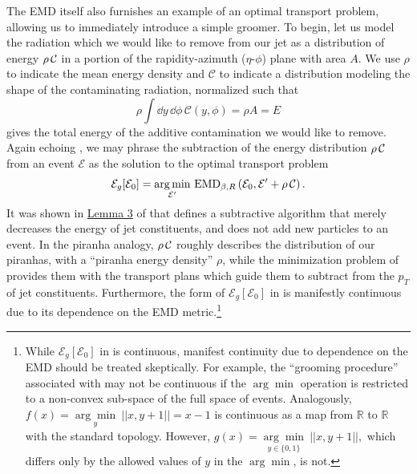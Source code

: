 The EMD itself also furnishes an example of an optimal transport problem, allowing us to immediately introduce a simple \PIRANHA{} groomer.
%
To begin, let us model the radiation which we would like to remove from our jet as a distribution of energy \(\rho\,\mathcal{C}\) in a portion of the rapidity-azimuth (\(\eta\)-\(\phi\)) plane with area \(A\).
%
We use \(\rho\) to indicate the mean energy density and \(\mathcal{C}\) to indicate a distribution modeling the shape of the contaminating radiation, normalized such that
\begin{equation}
    \rho\int \dd y\,\dd\phi\,\mathcal{C}(y,\phi) = \rho A = E
\end{equation}
gives the total energy of the additive contamination we would like to remove.
%
Again echoing , we may phrase the subtraction of the energy distribution \(\rho\,\mathcal{C}\) from an event \(\mathcal{E}\) as the solution to the optimal transport problem
\begin{align}
    \mathcal{E}_g[\mathcal E_0] = \underset{\mathcal{E}'}{\arg \min}\ {\rm EMD}_{\beta, R}
    \left(\mathcal{E}_0, \mathcal{E}' + \rhoC\right)
    \label{eqn:simple_piranha}
    .
\end{align}
%
It was shown in \href{https://arxiv.org/pdf/2004.04159.pdf#page=33\&zoom=100,0,0}{Lemma 3} of  that  defines a subtractive algorithm that merely decreases the energy of jet constituents, and does not add new particles to an event.
%
In the piranha analogy, \(\rho\,\mathcal{C}\) roughly describes the distribution of our piranhas, with a ``piranha energy density'' \(\rho\), while the minimization problem of  provides them with the transport plans which guide them to subtract from the \(p_T\) of jet constituents.
%
Furthermore, the form of \(\mathcal{E}_g[\mathcal E_0]\) in  is manifestly continuous due to its dependence on the EMD metric.\footnote{
While \(\mathcal{E}_g[\mathcal E_0]\) in  is continuous, manifest continuity due to dependence on the EMD should be treated skeptically.
%
For example, the ``grooming procedure'' associated with   may not be continuous if the \(\arg \min\) operation is restricted to a non-convex sub-space of the full space of events.
%
Analogously, \(
    f(x)
    =
    \underset{y}{\arg \min}\ ||x, y+1||
    =
    x-1
\)
is continuous as a map from \(\mathbb R\) to \(\mathbb R\) with the standard topology.
%
However, \(
    g(x)
    =
    \underset{y \in \{0, 1\}}{\arg \min}\ ||x, y+1||,
\)
which differs only by the allowed values of \(y\) in the \(\arg \min\), is not.
}


